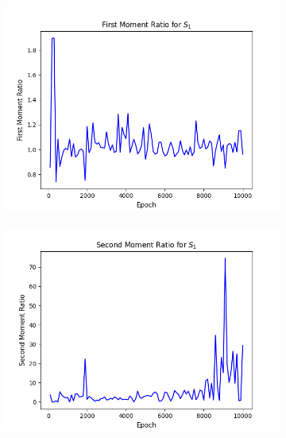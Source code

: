 \documentclass[11pt]{article} %
\begin{document}
\begin{figure}[H]
\centering
\begin{minipage}{\textwidth}
  \begin{subfigure}{.5\textwidth}
      \includegraphics[scale=0.6]{./images/moment_1_s1.png}
  \end{subfigure}
  \begin{subfigure}{.5\textwidth}
      \includegraphics[scale=0.6]{./images/moment_2_s1.png}
  \end{subfigure}
\end{minipage}
\begin{minipage}{\textwidth}

\end{minipage}
\end{figure}
\end{document}
